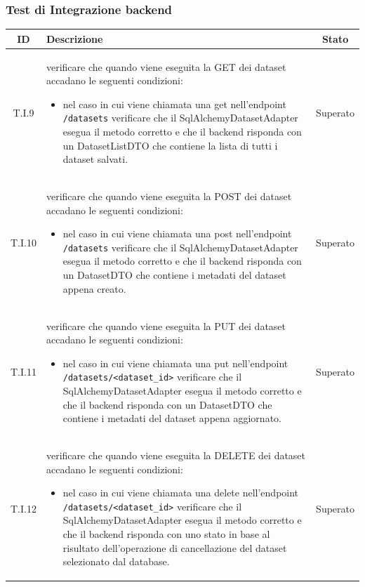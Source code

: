 \subsubsection{Test di Integrazione backend}
\label{subsec:test_integrazione_backend}
\begin{tabularx}{\textwidth}{|c|X|c|}
    \hline
    \textbf{ID} & \textbf{Descrizione} & \textbf{Stato} \\
    \hline
    \label{ti:ti9} T.I.9 & verificare che quando viene eseguita la GET dei dataset accadano le seguenti condizioni:
    \begin{itemize}
        \item nel caso in cui viene chiamata una get nell'endpoint \texttt{/datasets} verificare che il SqlAlchemyDatasetAdapter esegua il metodo corretto e che il backend risponda con un DatasetListDTO che contiene la lista di tutti i dataset salvati.
    \end{itemize} & Superato \\
    \hline 
    \label{ti:ti10} T.I.10 & verificare che quando viene eseguita la POST dei dataset accadano le seguenti condizioni:
    \begin{itemize}
        \item nel caso in cui viene chiamata una post nell'endpoint \texttt{/datasets} verificare che il SqlAlchemyDatasetAdapter esegua il metodo corretto e che il backend risponda con un DatasetDTO che contiene i metadati del dataset appena creato.
    \end{itemize} & Superato \\
    \hline
    \label{ti:ti11} T.I.11 & verificare che quando viene eseguita la PUT dei dataset accadano le seguenti condizioni:
    \begin{itemize}
        \item nel caso in cui viene chiamata una put nell'endpoint \texttt{/datasets/<dataset\_id>} verificare che il SqlAlchemyDatasetAdapter esegua il metodo corretto e che il backend risponda con un DatasetDTO che contiene i metadati del dataset appena aggiornato.
    \end{itemize} & Superato \\
    \hline  
    \label{ti:ti12} T.I.12 & verificare che quando viene eseguita la DELETE dei dataset accadano le seguenti condizioni:
    \begin{itemize}
        \item nel caso in cui viene chiamata una delete nell'endpoint \texttt{/datasets/<dataset\_id>} verificare che il SqlAlchemyDatasetAdapter esegua il metodo corretto e che il backend risponda con uno stato in base al risultato dell'operazione di cancellazione del dataset selezionato dal database.
    \end{itemize} & Superato \\
    \hline  
\end{tabularx}
